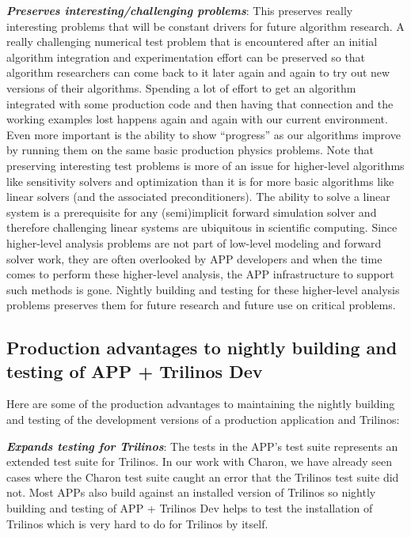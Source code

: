 \documentclass[pdf,ps2pdf,11pt]{SANDreport}
\begin{document}
{}\textit{\textbf{Preserves interesting/challenging problems}}: This preserves
really interesting problems that will be constant drivers for future algorithm
research.  A really challenging numerical test problem that is encountered
after an initial algorithm integration and experimentation effort can be
preserved so that algorithm researchers can come back to it later again and
again to try out new versions of their algorithms.  Spending a lot of effort
to get an algorithm integrated with some production code and then having that
connection and the working examples lost happens again and again with our
current environment.  Even more important is the ability to show ``progress''
as our algorithms improve by running them on the same basic production physics
problems.  Note that preserving interesting test problems is more of an issue
for higher-level algorithms like sensitivity solvers and optimization than it
is for more basic algorithms like linear solvers (and the associated
preconditioners).  The ability to solve a linear system is a prerequisite for
any (semi)implicit forward simulation solver and therefore challenging linear
systems are ubiquitous in scientific computing.  Since higher-level analysis
problems are not part of low-level modeling and forward solver work, they are
often overlooked by APP developers and when the time comes to perform these
higher-level analysis, the APP infrastructure to support such methods is gone.
Nightly building and testing for these higher-level analysis problems preserves
them for future research and future use on critical problems.


%
{}\subsection{Production advantages to nightly building and testing of APP +
Trilinos Dev}
%

Here are some of the production advantages to maintaining the nightly building
and testing of the development versions of a production application and
Trilinos:

{}\textit{\textbf{Expands testing for Trilinos}}: The tests in the APP's test
suite represents an extended test suite for Trilinos.  In our work with
Charon, we have already seen cases where the Charon test suite caught an error
that the Trilinos test suite did not.  Most APPs also build against an
installed version of Trilinos so nightly building and testing of APP +
Trilinos Dev helps to test the installation of Trilinos which is very hard to
do for Trilinos by itself.
\end{document}
